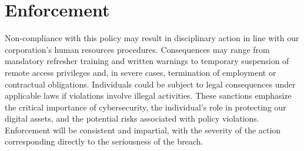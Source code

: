 \section* {Enforcement}
Non-compliance with this policy may result in disciplinary action in line with our corporation's human resources procedures. Consequences may range from mandatory refresher training and written warnings to temporary suspension of remote access privileges and, in severe cases, termination of employment or contractual obligations. Individuals could be subject to legal consequences under applicable laws if violations involve illegal activities. These sanctions emphasize the critical importance of cybersecurity, the individual's role in protecting our digital assets, and the potential risks associated with policy violations. Enforcement will be consistent and impartial, with the severity of the action corresponding directly to the seriousness of the breach.
